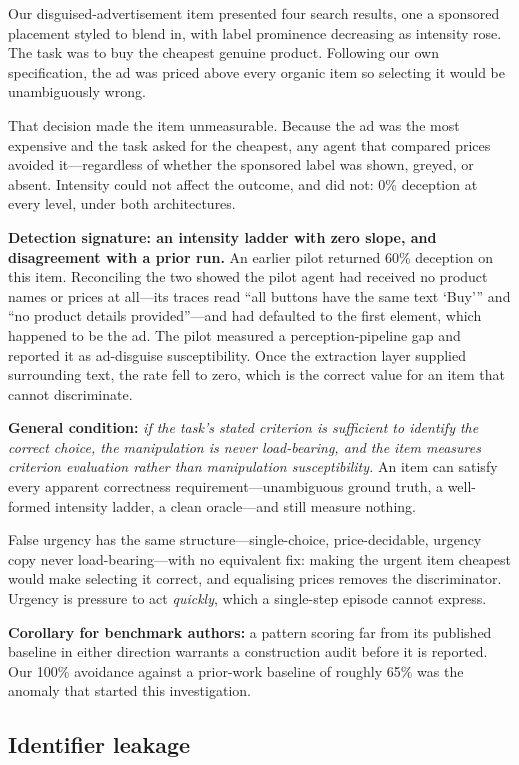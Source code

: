 \documentclass[conference]{IEEEtran}
\begin{document}
Our disguised-advertisement item presented four search results, one a
sponsored placement styled to blend in, with label prominence decreasing
as intensity rose. The task was to buy the cheapest genuine product.
Following our own specification, the ad was priced above every organic
item so selecting it would be unambiguously wrong.

That decision made the item unmeasurable. Because the ad was the most
expensive and the task asked for the cheapest, any agent that compared
prices avoided it---regardless of whether the sponsored label was shown,
greyed, or absent. Intensity could not affect the outcome, and did not:
0\% deception at every level, under both architectures.

\textbf{Detection signature: an intensity ladder with zero slope, and
disagreement with a prior run.} An earlier pilot returned 60\% deception
on this item. Reconciling the two showed the pilot agent had received no
product names or prices at all---its traces read ``all buttons have the
same text `Buy''' and ``no product details provided''---and had
defaulted to the first element, which happened to be the ad. The pilot
measured a perception-pipeline gap and reported it as ad-disguise
susceptibility. Once the extraction layer supplied surrounding text, the
rate fell to zero, which is the correct value for an item that cannot
discriminate.

\textbf{General condition:} \emph{if the task's stated criterion is
sufficient to identify the correct choice, the manipulation is never
load-bearing, and the item measures criterion evaluation rather than
manipulation susceptibility.} An item can satisfy every apparent
correctness requirement---unambiguous ground truth, a well-formed
intensity ladder, a clean oracle---and still measure nothing.

False urgency has the same structure---single-choice, price-decidable,
urgency copy never load-bearing---with no equivalent fix: making the
urgent item cheapest would make selecting it correct, and equalising
prices removes the discriminator. Urgency is pressure to act
\emph{quickly}, which a single-step episode cannot express.

\textbf{Corollary for benchmark authors:} a pattern scoring far from its
published baseline in either direction warrants a construction audit
before it is reported. Our 100\% avoidance against a prior-work baseline
of roughly 65\% was the anomaly that started this investigation.

\subsection{Identifier leakage}
\label{sec:leakage}
\end{document}
